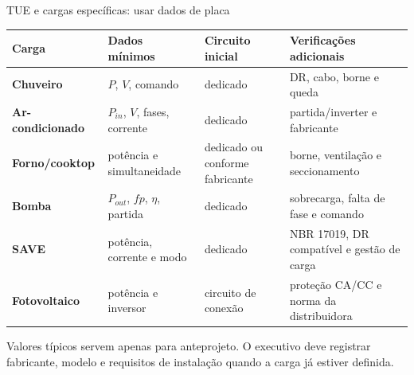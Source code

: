\begin{frame}{TUE e cargas específicas: usar dados de placa}
\scriptsize
\begin{tabularx}{\textwidth}{>{\bfseries}p{2.6cm}p{2.3cm}p{2.4cm}X}
\toprule
Carga & Dados mínimos & Circuito inicial & Verificações adicionais \\
\midrule
Chuveiro & $P$, $V$, comando & dedicado & DR, cabo, borne e queda \\
Ar-condicionado & $P_{in}$, $V$, fases, corrente & dedicado & partida/inverter e fabricante \\
Forno/cooktop & potência e simultaneidade & dedicado ou conforme fabricante & borne, ventilação e seccionamento \\
Bomba & $P_{out}$, $fp$, $\eta$, partida & dedicado & sobrecarga, falta de fase e comando \\
SAVE & potência, corrente e modo & dedicado & NBR 17019, DR compatível e gestão de carga \\
Fotovoltaico & potência e inversor & circuito de conexão & proteção CA/CC e norma da distribuidora \\
\bottomrule
\end{tabularx}
\vspace{2mm}
\begin{caixaObs}
Valores típicos servem apenas para anteprojeto. O executivo deve registrar fabricante, modelo e requisitos de instalação quando a carga já estiver definida.
\end{caixaObs}
\end{frame}


